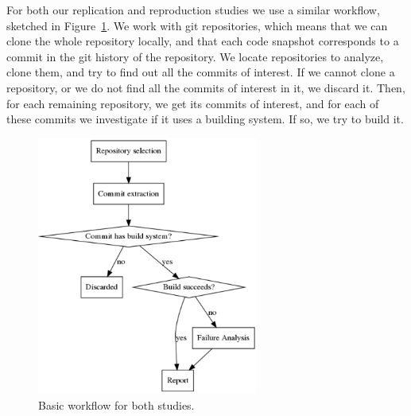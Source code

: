 For both our replication and reproduction studies we use a similar workflow, sketched in Figure~\ref{fig:methodology}. We work with git repositories, which means that we can clone the whole repository locally, and that each code snapshot corresponds to a commit in the git history of the repository. We locate repositories to analyze, clone them, and try to find out all the commits of interest. If we cannot clone a repository, or we do not find all the commits of interest in it, we discard it. Then, for each remaining repository, we get its commits of interest, and for each of these commits we investigate if it uses a building system. If so, we try to build it.

\begin{figure}[t]
\centering    
\includegraphics[height=8.5cm]{pages/01-Buildability/images/Methodology.pdf}
\caption{Basic workflow for both studies.}
\label{fig:methodology}
\end{figure}


\renewcommand{\tabcolsep}{3pt}

